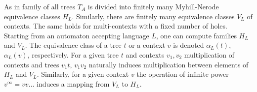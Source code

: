 As in \cite{bp} family of all trees $T_A$ is divided into finitely many Myhill-Nerode equivalence classes $H_L$. Similarly, there are finitely many equivalence classes $V_L$ of contexts. The same holds for multi-contexts with a fixed number of holes. Starting from an automaton accepting language $L$, one can compute families $H_L$ and $V_L$. The equivalence class of a tree $t$ or a context $v$ is denoted $\alpha_L(t)$, $\alpha_L(v)$, respectively. For a given tree $t$ and contexts $v_1,v_2$ multiplication of contexts and trees $v_1t$, $v_1v_2$ naturally induces multiplication between elements of $H_L$ and $V_L$. Similarly, for a given context $v$ the operation of infinite power $v^\infty = vv\ldots$ induces a mapping from $V_L$ to $H_L$. 
